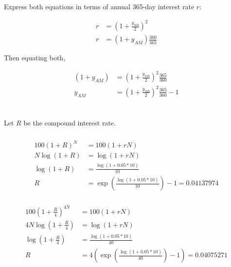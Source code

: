 \documentclass[11pt]{scrartcl}
\begin{document}
\section{}

Express both equations in terms of annual 365-day interest rate $r$:

\begin{align*}
r &= (1+\frac{y_{SB}}{2})^2 \\
r &= (1+y_{AM}) \frac{360}{365}
\end{align*}

Then equating both,

\begin{align*}
(1+y_{AM}) &= \left(1 + \frac{y_{SB}}{2}\right)^2 \frac{365}{360}\\
y_{AM} &= \left(1 + \frac{y_{SB}}{2}\right)^2 \frac{365}{360} - 1
\end{align*}

\section{}

\subsection{}

Let $R$ be the compound interest rate.

\subsubsection{}

\begin{align*}
100(1+R)^N &= 100(1+rN) \\
N \log{(1+R)} &= \log{(1+rN)} \\
\log{(1+R)} &= \frac{\log{(1+0.05*10)}}{10} \\
R &= \exp{\left(\frac{\log{(1+0.05*10)}}{10}\right)} - 1 = 0.04137974
\end{align*}

\subsubsection{}

\begin{align*}
100\left(1+\frac{R}{4}\right)^{4N} &= 100(1+rN) \\
4N \log{\left(1+\frac{R}{4}\right)} &= \log{(1+rN)} \\
\log{\left(1+\frac{R}{4}\right)} &= \frac{\log{(1+0.05*10)}}{40} \\
R &= 4\left(\exp{\left(\frac{\log{(1+0.05*10)}}{40}\right)} - 1 \right)= 0.04075271
\end{align*}
\end{document}
